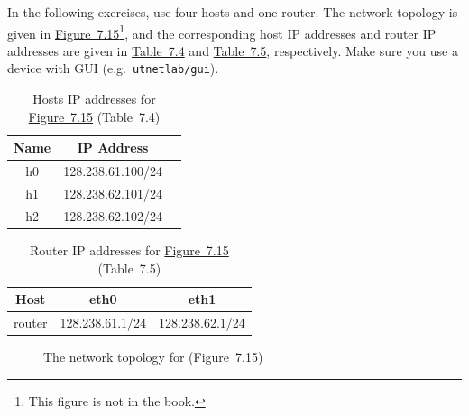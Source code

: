 \documentclass{../UTNetLab}
\begin{document}
    In the following exercises, use four hosts and one router. The network topology is given in \hyperref[fig:7.15]{Figure~7.15}\footnote{This figure is not in the book.}, and the corresponding host IP addresses and router IP addresses are given in \hyperref[tab:7.4]{Table~7.4} and \hyperref[tab:7.5]{Table~7.5}, respectively.
    Make sure you use a device with GUI (e.g.\ \texttt{utnetlab/gui}).

    \begin{table}[H]
        \caption{Hosts IP addresses for \hyperref[fig:7.15]{Figure~7.15} (Table~7.4)}
        \label{tab:7.4}
        \centering
        \begin{tabular}{ *3c }
            \hline \hline
            Name & IP Address \\
            \hline
                h0 & 128.238.61.100/24 \\
                h1 & 128.238.62.101/24 \\
                h2 & 128.238.62.102/24 \\
            \hline \hline
            \end{tabular}
    \end{table}

    \begin{table}[H]
        \caption{Router IP addresses for \hyperref[fig:7.15]{Figure~7.15} (Table~7.5)}
        \label{tab:7.5}
        \centering
        \begin{tabular}{ *3c }
            \hline \hline
            Host & eth0 & eth1 \\
            \hline
            router & 128.238.61.1/24 & 128.238.62.1/24 \\
            \hline \hline
            \end{tabular}
    \end{table}

    \begin{figure}[H]
        \centering
        \caption{The network topology for  (Figure~7.15)}
        \label{fig:7.15}
    \end{figure}
\end{document}
